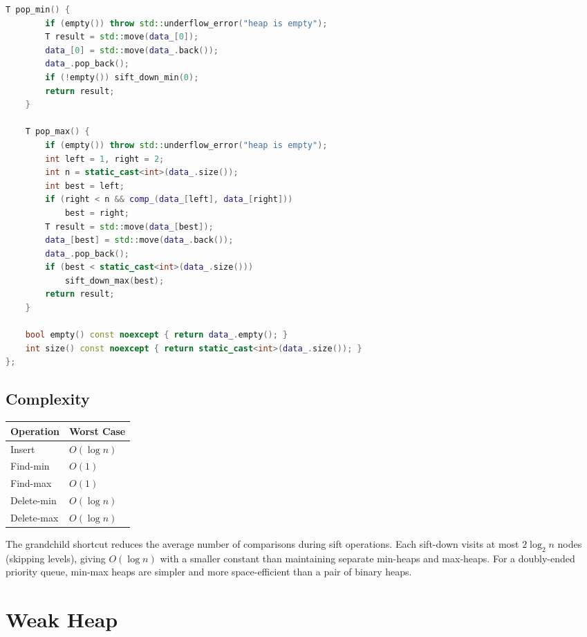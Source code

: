 \begin{lstlisting}[language=C++]
    T pop_min() {
        if (empty()) throw std::underflow_error("heap is empty");
        T result = std::move(data_[0]);
        data_[0] = std::move(data_.back());
        data_.pop_back();
        if (!empty()) sift_down_min(0);
        return result;
    }

    T pop_max() {
        if (empty()) throw std::underflow_error("heap is empty");
        int left = 1, right = 2;
        int n = static_cast<int>(data_.size());
        int best = left;
        if (right < n && comp_(data_[left], data_[right]))
            best = right;
        T result = std::move(data_[best]);
        data_[best] = std::move(data_.back());
        data_.pop_back();
        if (best < static_cast<int>(data_.size()))
            sift_down_max(best);
        return result;
    }

    bool empty() const noexcept { return data_.empty(); }
    int size() const noexcept { return static_cast<int>(data_.size()); }
};
\end{lstlisting}

\subsection{Complexity}

\begin{center}
\begin{tabular}{ll}
\hline
\textbf{Operation} & \textbf{Worst Case} \\
\hline
Insert          & $O(\log n)$ \\
Find-min        & $O(1)$ \\
Find-max        & $O(1)$ \\
Delete-min      & $O(\log n)$ \\
Delete-max      & $O(\log n)$ \\
\hline
\end{tabular}
\end{center}

The grandchild shortcut reduces the average number of comparisons during sift operations. Each sift-down visits at most $2 \log_2 n$ nodes (skipping levels), giving $O(\log n)$ with a smaller constant than maintaining separate min-heaps and max-heaps. For a doubly-ended priority queue, min-max heaps are simpler and more space-efficient than a pair of binary heaps.

\section{Weak Heap}

